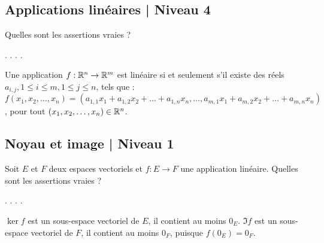\subsection{Applications linéaires | Niveau 4}

\begin{question}
Quelles sont les assertions vraies ?
\begin{answers}  
.
.
.
.
\end{answers}
\begin{explanations} Une application $f:\mathbb{R}^n \to \mathbb{R}^m$ est linéaire si et seulement s'il existe des réels $a_{i,j}, 1\le i \le m, 1\le j \le n$,  tels que :\\ $f(x_1,x_2,\dots,x_n)=(a_{1,1}x_1+a_{1,2}x_2 + \dots + a_{1,n}x_n,\dots, a_{m,1}x_1+a_{m,2}x_2 + \dots + a_{m,n}x_n)$, pour tout $(x_1,x_2,\dots,x_n) \in \mathbb{R}^n$.
\end{explanations}
\end{question}

\subsection{Noyau et image  | Niveau 1}

\begin{question}
Soit $E$ et $F$ deux espaces vectoriels et $f:E\to F$ une application linéaire. Quelles sont les assertions vraies ?
\begin{answers}  
.
.
.
.
\end{answers}
\begin{explanations} $\ker f$ est un sous-espace vectoriel de $E$, il contient au moins $0_E$.
\vskip0mm
$\Im f $ est un sous-espace vectoriel de $F$, il contient au moins $0_F$, puisque $f(0_E)=0_F$.
\end{explanations}
\end{question}

